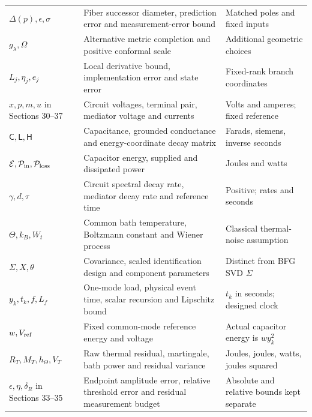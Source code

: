 \documentclass[11pt,letterpaper]{article}
\theoremstyle{definition}
\numberwithin{equation}{section}
\begin{document}
\begin{longtable}{p{}p{}p{}}
$\Delta(p),\epsilon,\sigma$ & Fiber successor diameter, prediction error and measurement-error bound & Matched poles and fixed inputs\\
$g_\lambda,\Omega$ & Alternative metric completion and positive conformal scale & Additional geometric choices\\
$L_j,\eta_j,e_j$ & Local derivative bound, implementation error and state error & Fixed-rank branch coordinates\\
$x,p,m,u$ in Sections 30--37 & Circuit voltages, terminal pair, mediator voltage and currents & Volts and amperes; fixed reference\\
$\mathsf C,\mathsf L,\mathsf H$ & Capacitance, grounded conductance and energy-coordinate decay matrix & Farads, siemens, inverse seconds\\
$\mathcal E,\mathcal P_{\rm in},\mathcal P_{\rm loss}$ & Capacitor energy, supplied and dissipated power & Joules and watts\\
$\gamma,d,\tau$ & Circuit spectral decay rate, mediator decay rate and reference time & Positive; rates and seconds\\
$\Theta,k_B,W_t$ & Common bath temperature, Boltzmann constant and Wiener process & Classical thermal-noise assumption\\
$\Sigma,X,\theta$ & Covariance, scaled identification design and component parameters & Distinct from BFG SVD $\Sigma$\\
$y_k,t_k,f,L_f$ & One-mode load, physical event time, scalar recursion and Lipschitz bound & $t_k$ in seconds; designed clock\\
$w,V_{\rm ref}$ & Fixed common-mode reference energy and voltage & Actual capacitor energy is $wy_k^2$\\
$R_T,M_T,h_\Theta,V_T$ & Raw thermal residual, martingale, bath power and residual variance & Joules, joules, watts, joules squared\\
$\epsilon,\eta,\delta_R$ in Sections 33--35 & Endpoint amplitude error, relative threshold error and residual measurement budget & Absolute and relative bounds kept separate\\


\bottomrule
\end{longtable}

\clearpage
\end{document}
